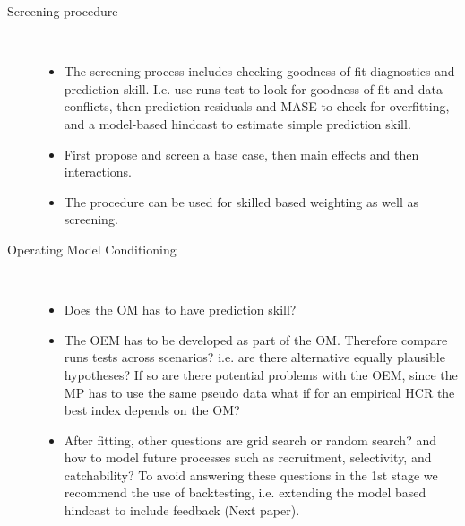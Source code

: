 \begin{description}
    \item[Screening procedure]~
    \begin{itemize}
        \item The screening process includes checking goodness of fit diagnostics and prediction skill. I.e. use runs test to look for goodness of fit and data conflicts, then prediction residuals and MASE to check for overfitting, and a model-based hindcast to estimate simple prediction skill.
        \item First propose and screen a base case, then main effects and then interactions. 
       \item The procedure can be used for skilled based weighting as well as screening.
    \end{itemize}
  \item[Operating Model Conditioning]~
    \begin{itemize}   
        \item Does the OM has to have prediction skill? 
        \item The OEM has to be developed as part of the OM. Therefore compare runs tests across scenarios? i.e. are there alternative equally plausible hypotheses? If so are there potential problems with the OEM, since the MP has to use the same pseudo data what if for an empirical HCR the best index depends on the OM?
    \item After fitting, other questions are grid search or random search? and how to model future processes such as recruitment, selectivity, and catchability? To avoid answering these questions in the 1st stage we recommend the use of backtesting, i.e. extending the model based hindcast to include feedback (Next paper).
  \end{itemize}


\end{description}
